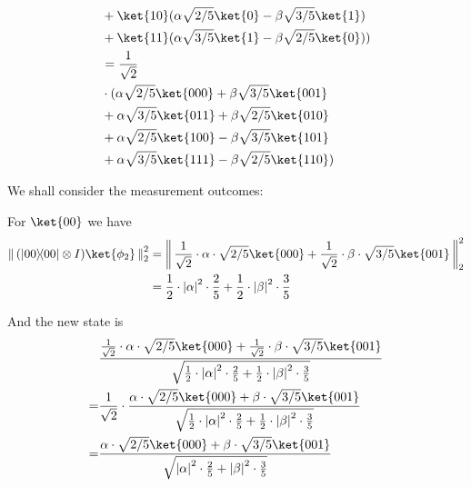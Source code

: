 \documentclass{article}
\newcommand{\ketbra}[2]{|#1\rangle\!\langle #2|}
\newcommand{\norm}[1]{\left\|\,#1\,\right\|}       %
\newcommand{\enorm}[1]{\norm{#1}_{\mathrm{2}}}      %
\newcommand{\abs}[1]{\left\lvert #1 \right\rvert}
\begin{document}
\begin{enumerate}
$$\begin{aligned}
                         & +\ket{10}(\alpha\sqrt{2/5}\ket{0}-\beta\sqrt{3/5}\ket{1})                                                                      \\
                         & +\ket{11}(\alpha\sqrt{3/5}\ket{1}-\beta\sqrt{2/5}\ket{0}))                                                                     \\
                         & =\frac{1}{\sqrt{2}}                                                                                                            \\
                         & \cdot(\alpha\sqrt{2/5}\ket{000}+\beta\sqrt{3/5}\ket{001}                                                                       \\
                         & +\alpha\sqrt{3/5}\ket{011}+\beta\sqrt{2/5}\ket{010}                                                                            \\
                         & +\alpha\sqrt{2/5}\ket{100}-\beta\sqrt{3/5}\ket{101}                                                                            \\
                         & +\alpha\sqrt{3/5}\ket{111}-\beta\sqrt{2/5}\ket{110})                                                                           \\
          \end{aligned}$$

        We shall consider the measurement outcomes:

        For $\ket{00}$ we have $$\begin{aligned}
            \enorm{(\ketbra{00}{00}\otimes I)\ket{\phi_2}}^2 & =\enorm{\frac{1}{\sqrt{2}}\cdot\alpha\cdot\sqrt{2/5}\ket{000}+\frac{1}{\sqrt{2}}\cdot\beta\cdot\sqrt{3/5}\ket{001}}^2 \\
                                                             & =\frac{1}{2}\cdot\abs{\alpha}^2\cdot\frac{2}{5}+\frac{1}{2}\cdot\abs{\beta}^2\cdot\frac{3}{5}                         \\
          \end{aligned}$$

        And the new state is $$\begin{aligned}
              & \frac{\frac{1}{\sqrt{2}}\cdot\alpha\cdot\sqrt{2/5}\ket{000}+\frac{1}{\sqrt{2}}\cdot\beta\cdot\sqrt{3/5}\ket{001}}{\sqrt{\frac{1}{2}\cdot\abs{\alpha}^2\cdot\frac{2}{5}+\frac{1}{2}\cdot\abs{\beta}^2\cdot\frac{3}{5}}} \\
            = & \frac{1}{\sqrt{2}}\cdot\frac{\alpha\cdot\sqrt{2/5}\ket{000}+\beta\cdot\sqrt{3/5}\ket{001}}{\sqrt{\frac{1}{2}\cdot\abs{\alpha}^2\cdot\frac{2}{5}+\frac{1}{2}\cdot\abs{\beta}^2\cdot\frac{3}{5}}}                        \\
            = & \frac{\alpha\cdot\sqrt{2/5}\ket{000}+\beta\cdot\sqrt{3/5}\ket{001}}{\sqrt{\abs{\alpha}^2\cdot\frac{2}{5}+\abs{\beta}^2\cdot\frac{3}{5}}}                                                                               \\
          \end{aligned}$$


\end{enumerate}
\end{document}
